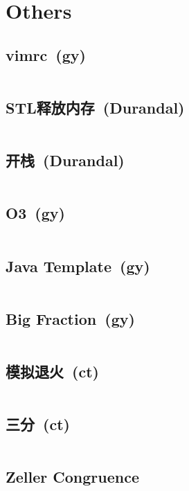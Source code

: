 \chapter{Others}
\section{vimrc\ \small(gy)}
	\inputminted{vim}{Others/.vimrc}
\section{STL释放内存\ \small(Durandal)}
	\inputminted{cpp}{Others/stl_clear.cpp}
\section{开栈\ \small(Durandal)}
	\inputminted{cpp}{Others/rsp.cpp}
\section{O3\ \small(gy)}
	\inputminted{cpp}{Others/o3.cpp}
\section{Java Template\ \small(gy)}
	\inputminted{java}{Others/Template.java}
\section{Big Fraction\ \small(gy)}
	\inputminted{kotlin}{Others/big_fraction.kt}
\section{模拟退火\ \small(ct)}
	\inputminted{cpp}{Others/simulated_annealing.cpp}
\section{三分\ \small(ct)}
	\inputminted{cpp}{Others/cubic_search.cpp}
\section{Zeller Congruence}
	\inputminted{cpp}{Others/zeller_congruence.cpp}
